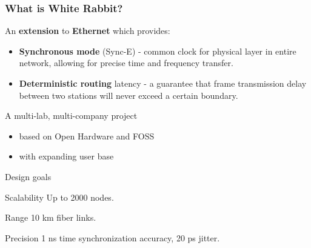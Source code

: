 \documentclass[compress,red]{beamer}
\begin{document}
\frame
{
  \frametitle{What is White Rabbit?}

\begin{block}{An \textbf{extension} to \textbf{Ethernet} which provides:}
  \begin{itemize}
  \item \textbf{Synchronous mode} (Sync-E) - common clock for physical layer in entire network, allowing for precise time and frequency transfer.

\item \textbf{Deterministic routing} latency - a guarantee that frame transmission delay between two stations will never exceed a certain boundary.
\end{itemize}
\end{block}

\begin{block}{A multi-lab, multi-company project}
\begin{itemize}
\item based on Open Hardware and FOSS
\item with expanding user base
\end{itemize}
\end{block}
}

\begin{frame}{Design goals}
\begin{block}{Scalability}
Up to 2000 nodes.
\end{block}

\begin{block}{Range}
10 km fiber links.
\end{block}

\begin{block}{Precision}
1 ns time synchronization accuracy, 20 ps jitter.
\end{block}

\end{frame}

\end{document}
